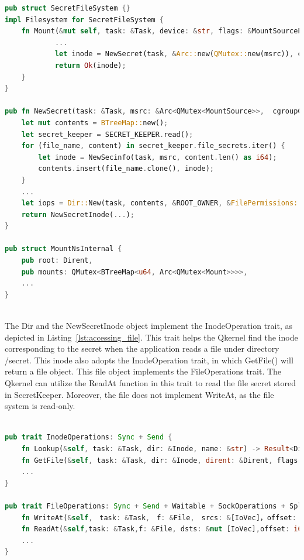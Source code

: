 \begin{lstlisting}[language=rust, caption= API for secret file system, label={lst:sub_filesystem}]
pub struct SecretFileSystem {}
impl Filesystem for SecretFileSystem {
    fn Mount(&mut self, task: &Task, device: &str, flags: &MountSourceFlags, data: &str) -> Result<Inode> {
            ...
            let inode = NewSecret(task, &Arc::new(QMutex::new(msrc)), cgroups);
            return Ok(inode);
    }
}

pub fn NewSecret(task: &Task, msrc: &Arc<QMutex<MountSource>>,  cgroupControllers: BTreeMap<String, String>) -> Inode {
    let mut contents = BTreeMap::new();
    let secret_keeper = SECRET_KEEPER.read();
    for (file_name, content) in secret_keeper.file_secrets.iter() {
        let inode = NewSecinfo(task, msrc, content.len() as i64);
        contents.insert(file_name.clone(), inode);
    }
    ...
    let iops = Dir::New(task, contents, &ROOT_OWNER, &FilePermissions::FromMode(FileMode(0o0555)));	
    return NewSecretInode(...);
}

pub struct MountNsInternal {
    pub root: Dirent,
    pub mounts: QMutex<BTreeMap<u64, Arc<QMutex<Mount>>>>,
    ...
}
      
\end{lstlisting}

The Dir and the NewSecretInode object implement the InodeOperation trait, as depicted in Listing~\ref{lst:accessing_file}. This trait helps the Qkernel find the inode corresponding to the secret when the application reads a file under directory /secret. This inode also adopts the InodeOperation trait, 
in which GetFile() will return a file object. This file object implements the FileOperations trait. The Qkernel can utilize the ReadAt function in this trait to read the file secret stored in SecretKeeper. Moreover, the file does not implement WriteAt, as the file system is read-only.

\begin{lstlisting}[language=rust, caption= Interface for accessing the file type secrets, label={lst:accessing_file}]

pub trait InodeOperations: Sync + Send {
    fn Lookup(&self, task: &Task, dir: &Inode, name: &str) -> Result<Dirent>;
    fn GetFile(&self, task: &Task, dir: &Inode, dirent: &Dirent, flags: FileFlags) -> Result<File>;
    ...
}

pub trait FileOperations: Sync + Send + Waitable + SockOperations + SpliceOperations {
    fn WriteAt(&self,　task: &Task,　f: &File,　srcs: &[IoVec]，offset: i64,_blocking: bool) -> Result<i64>;
    fn ReadAt(&self,task: &Task,f: &File, dsts: &mut [IoVec],offset: i64, _blocking: bool,) -> Result<i64>;
    ...
}
    
      
\end{lstlisting}

